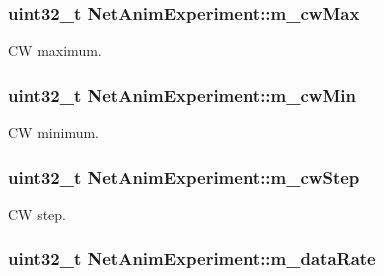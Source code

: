 \subsubsection[{\texorpdfstring{m\+\_\+cw\+Max}{m_cwMax}}]{\setlength{\rightskip}{0pt plus 5cm}uint32\+\_\+t Net\+Anim\+Experiment\+::m\+\_\+cw\+Max}\hypertarget{classNetAnimExperiment_a36377073bd491b2213fd752da30e9362}{}\label{classNetAnimExperiment_a36377073bd491b2213fd752da30e9362}


CW maximum. 

\subsubsection[{\texorpdfstring{m\+\_\+cw\+Min}{m_cwMin}}]{\setlength{\rightskip}{0pt plus 5cm}uint32\+\_\+t Net\+Anim\+Experiment\+::m\+\_\+cw\+Min}\hypertarget{classNetAnimExperiment_a2d4b4380bbc3962d37415236ebc46f64}{}\label{classNetAnimExperiment_a2d4b4380bbc3962d37415236ebc46f64}


CW minimum. 

\subsubsection[{\texorpdfstring{m\+\_\+cw\+Step}{m_cwStep}}]{\setlength{\rightskip}{0pt plus 5cm}uint32\+\_\+t Net\+Anim\+Experiment\+::m\+\_\+cw\+Step}\hypertarget{classNetAnimExperiment_aca23676d0e5f1c69a82cea6d8d8af784}{}\label{classNetAnimExperiment_aca23676d0e5f1c69a82cea6d8d8af784}


CW step. 

\subsubsection[{\texorpdfstring{m\+\_\+data\+Rate}{m_dataRate}}]{\setlength{\rightskip}{0pt plus 5cm}uint32\+\_\+t Net\+Anim\+Experiment\+::m\+\_\+data\+Rate}\hypertarget{classNetAnimExperiment_a7998af435f1259ef914a8e434f76a0c0}{}\label{classNetAnimExperiment_a7998af435f1259ef914a8e434f76a0c0}


